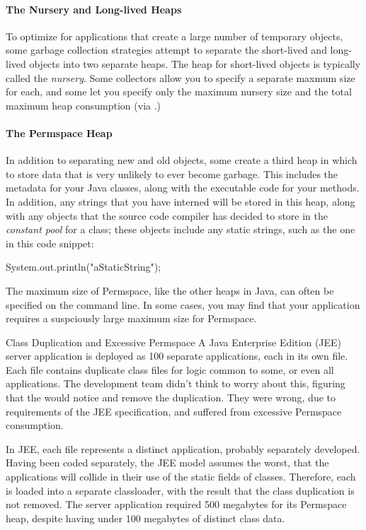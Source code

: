 \paragraph{The Nursery and Long-lived Heaps}
To optimize for applications that create a large number of temporary objects, 
some garbage collection strategies attempt to separate the short-lived and
long-lived objects into two separate heaps. The heap for short-lived objects is
typically called the \emph{nursery}. Some collectors allow you to specify a
separate maxmum size for each, and some let you specify only the
maximum nursery size and the total maximum heap consumption (via .)


\paragraph{The Permspace Heap}
In addition to separating new and old objects, some \jres create
a third heap in which to store data that is very unlikely to ever become
garbage. This includes the \jres metadata for your Java classes, along with the
executable code for your methods. In addition, any strings that you have
interned will be stored in this heap, along with any objects that the source
code compiler has decided to store in the \emph{constant pool} for a class;
these objects include any static strings, such as the one in this code snippet:

\begin{shortlisting}
System.out.println("aStaticString");
\end{shortlisting} 

The maximum size of Permspace, like the other heaps in Java, can often be
specified on the command line. In some cases, you may find that your application
requires a suspciously large maximum size for Permspace.
 
\begin{example}{Class Duplication and Excessive Permspace}
A Java Enterprise Edition (JEE) server application is deployed as 100 separate
applications, each in its own  file. Each  file contains
duplicate class files for logic common to some, or even all applications.
The development team didn't think to worry about this, figuring that the
\jre would notice and remove the duplication. They were wrong, due to
requirements of the JEE specification, and suffered from excessive Permspace
consumption.

In JEE, each  file represents a distinct application, probably
separately developed. Having been coded separately, the JEE model assumes the
worst, that the applications will collide in their use of the static fields of
classes. Therefore, each  is loaded into a separate classloader, with
the result that the class duplication is not removed. The server application
required 500 megabytes for its Permspace heap, despite having under 100 megabytes
of distinct class data.
\end{example}

